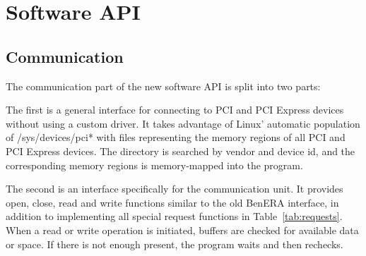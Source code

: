 \section{Software API}

\TODO

\subsection{Communication}

The communication part of the new software API is split into two parts:

The first is a general interface for connecting to PCI and PCI Express devices without using a custom driver.
It takes advantage of Linux' automatic population of /sys/devices/pci* with files representing the memory regions of all PCI and PCI Express devices.
The directory is searched by vendor and device id, and the corresponding memory regions is memory-mapped into the program.

The second is an interface specifically for the communication unit.
It provides open, close, read and write functions similar to the old BenERA interface, in addition to implementing all special request functions in Table~\ref{tab:requests}.
When a read or write operation is initiated, buffers are checked for available data or space.
If there is not enough present, the program waits and then rechecks.

